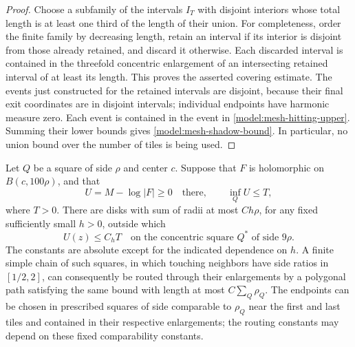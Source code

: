 \begin{proof}
Choose a subfamily of the intervals \(I_T\) with disjoint interiors
whose total length is at least one third of the length of their union.
For completeness, order the finite family by decreasing length, retain
an interval if its interior is disjoint from those already retained,
and discard it otherwise.  Each discarded interval is contained in the
threefold concentric enlargement of an intersecting retained interval
of at least its length.  This proves the asserted covering estimate.
The events just constructed for the retained intervals are disjoint,
because their final exit coordinates are in disjoint intervals;
individual endpoints have harmonic measure zero.  Each event is
contained in the event in \eqref{model:mesh-hitting-upper}.  Summing their
lower bounds gives \eqref{model:mesh-shadow-bound}.  In particular, no
union bound over the number of tiles is being used.
\end{proof}

\begin{lemma}
\label{model:mesh-routing}
Let \(Q\) be a square of side \(\rho\) and center \(c\).  Suppose that
\(F\) is holomorphic on \(B(c,100\rho)\), and that
\[
 U=M-\log|F|\ge0
 \quad\text{there},\qquad
 \inf_Q U\le T,
\]
where \(T>0\).  There are disks with sum of radii at most
\(C h\rho\), for any fixed sufficiently small \(h>0\), outside which
\begin{equation}
 U(z)\le C_hT
 \quad\text{on the concentric square }Q^*\text{ of side }9\rho.
 \label{model:mesh-local-high}
\end{equation}
The constants are absolute except for the indicated dependence on
\(h\).  A finite simple chain of such squares, in which touching
neighbors have side ratios in \([1/2,2]\), can consequently be routed
through their enlargements by a polygonal path satisfying the same
bound with length at most \(C\sum_Q\rho_Q\).  The endpoints can be
chosen in prescribed squares of side comparable to \(\rho_Q\)
near the first and last tiles and contained in their respective
enlargements; the routing constants may depend on these fixed
comparability constants.
\end{lemma}

